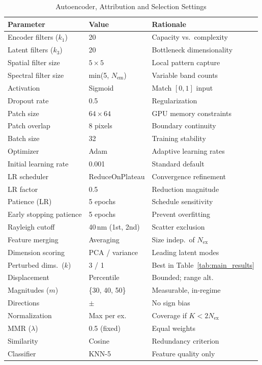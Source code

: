 \begin{table}[!t]
\centering
\caption{Autoencoder, Attribution and Selection Settings}
\label{tab:hyperparams}
\footnotesize
\begin{tabular}{@{}lll@{}}
\toprule
\textbf{Parameter} & \textbf{Value} & \textbf{Rationale} \\
\midrule
Encoder filters ($k_1$) & 20 & Capacity vs.~complexity \\
Latent filters ($k_3$) & 20 & Bottleneck dimensionality \\
Spatial filter size & $5 \times 5$ & Local pattern capture \\
Spectral filter size & min(5, $N_{\text{em}}$) & Variable band counts \\
Activation & Sigmoid & Match $[0,1]$ input \\
Dropout rate & 0.5 & Regularization \\
Patch size & $64 \times 64$ & GPU memory constraints \\
Patch overlap & 8 pixels & Boundary continuity \\
Batch size & 32 & Training stability \\
Optimizer & Adam~\cite{kingma2014adam} & Adaptive learning rates \\
Initial learning rate & 0.001 & Standard default \\
LR scheduler & ReduceOnPlateau & Convergence refinement \\
LR factor & 0.5 & Reduction magnitude \\
Patience (LR) & 5 epochs & Schedule sensitivity \\
Early stopping patience & 5 epochs & Prevent overfitting \\
\midrule
Rayleigh cutoff & 40\,nm (1st, 2nd) & Scatter exclusion \\
Feature merging & Averaging & Size indep.\ of $N_{\text{ex}}$ \\
Dimension scoring & PCA / variance & Leading latent modes \\
Perturbed dims.\ ($k$) & 3 / 1 & Best in Table~\ref{tab:main_results} \\
Displacement & Percentile & Bounded; range alt. \\
Magnitudes ($m$) & \{30, 40, 50\} & Measurable, in-regime \\
Directions & $\pm$ & No sign bias \\
Normalization & Max per ex. & Coverage if $K{<}2N_{\text{ex}}$ \\
MMR ($\lambda$) & 0.5 (fixed) & Equal weights~\cite{carbonell1998use} \\
Similarity & Cosine & Redundancy criterion \\
Classifier & KNN-5 & Feature quality only \\
\bottomrule
\end{tabular}
\end{table}

